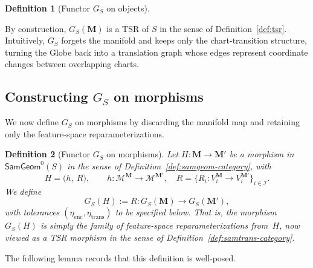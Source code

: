 \documentclass[11pt]{article}
\newtheorem{definition}{Definition}
\newcommand{\SamGeom}{\mathsf{SamGeom}}
\begin{document}
\begin{definition}[Functor $G_S$ on objects]
\begin{enumerate}[label=(\roman*),leftmargin=*]
\end{enumerate}
\end{definition}

By construction, $G_S(\mathbf{M})$ is a TSR of $S$ in the sense of
Definition~\ref{def:tsr}. Intuitively, $G_S$ forgets the manifold and keeps
only the chart-transition structure, turning the Globe back into a
translation graph whose edges represent coordinate changes between overlapping
charts.

\subsection{Constructing \texorpdfstring{$G_S$}{G\_S} on morphisms}
\label{subsec:G-on-morphisms}

We now define $G_S$ on morphisms by discarding the manifold map and retaining
only the feature-space reparameterizations.

\begin{definition}[Functor $G_S$ on morphisms]
\label{def:G-on-morphisms}
Let $H : \mathbf{M} \to \mathbf{M}'$ be a morphism in $\SamGeom^0(S)$ in the
sense of Definition~\ref{def:samgeom-category}, with
\[
H = \bigl(h,\ R\bigr),
\qquad
h : \mathcal{M}^{\mathbf{M}} \to \mathcal{M}^{\mathbf{M}'},
\quad
R = \{R_i : V_i^{\mathbf{M}} \to V_i^{\mathbf{M}'}\}_{i\in\mathcal{I}}.
\]
We define
\[
G_S(H) := R : G_S(\mathbf{M}) \to G_S(\mathbf{M}'),
\]
with tolerances $(\eta_{\mathrm{enc}}, \eta_{\mathrm{trans}})$ to be specified
below. That is, the morphism $G_S(H)$ is simply the family of feature-space
reparameterizations from~$H$, now viewed as a TSR morphism in the sense of
Definition~\ref{def:samtrans-category}.
\end{definition}

The following lemma records that this definition is well-posed.
\end{document}

